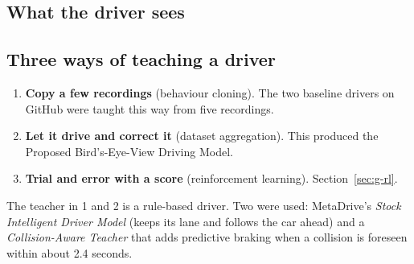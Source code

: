 \subsection{What the driver sees}


\subsection{Three ways of teaching a driver}
\begin{enumerate}
\item \textbf{Copy a few recordings} (behaviour cloning). The two baseline drivers on GitHub were taught this way from five recordings.
\item \textbf{Let it drive and correct it} (dataset aggregation). This produced the Proposed Bird's-Eye-View Driving Model.
\item \textbf{Trial and error with a score} (reinforcement learning). Section~\ref{sec:g-rl}.
\end{enumerate}
The teacher in 1 and 2 is a rule-based driver. Two were used: MetaDrive's \emph{Stock Intelligent Driver Model} (keeps its lane and follows the car ahead) and a \emph{Collision-Aware Teacher} that adds predictive braking when a collision is foreseen within about 2.4 seconds.
